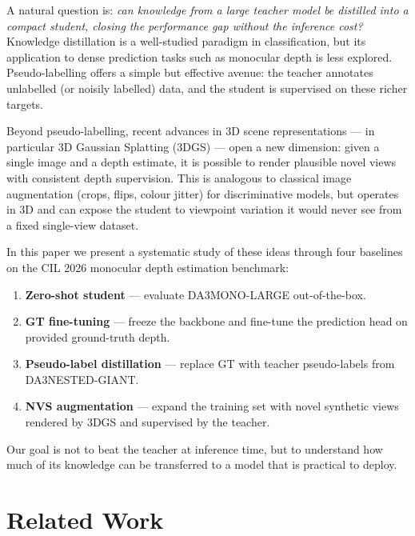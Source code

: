 \documentclass{article}
\begin{document}
A natural question is: \emph{can knowledge from a large teacher model be distilled into a compact student, closing the performance gap without the inference cost?}
Knowledge distillation \cite{TODO_hinton_kd} is a well-studied paradigm in classification, but its application to dense prediction tasks such as monocular depth is less explored.
Pseudo-labelling \cite{TODO_pseudolabel} offers a simple but effective avenue: the teacher annotates unlabelled (or noisily labelled) data, and the student is supervised on these richer targets.

Beyond pseudo-labelling, recent advances in 3D scene representations — in particular 3D Gaussian Splatting (3DGS) \cite{TODO_3dgs} — open a new dimension: given a single image and a depth estimate, it is possible to render plausible novel views with consistent depth supervision.
This is analogous to classical image augmentation (crops, flips, colour jitter) for discriminative models, but operates in 3D and can expose the student to viewpoint variation it would never see from a fixed single-view dataset.

In this paper we present a systematic study of these ideas through four baselines on the CIL 2026 monocular depth estimation benchmark:
\begin{enumerate}
    \item \textbf{Zero-shot student} — evaluate DA3MONO-LARGE out-of-the-box.
    \item \textbf{GT fine-tuning} — freeze the backbone and fine-tune the prediction head on provided ground-truth depth.
    \item \textbf{Pseudo-label distillation} — replace GT with teacher pseudo-labels from DA3NESTED-GIANT.
    \item \textbf{NVS augmentation} — expand the training set with novel synthetic views rendered by 3DGS and supervised by the teacher.
\end{enumerate}
Our goal is not to beat the teacher at inference time, but to understand how much of its knowledge can be transferred to a model that is practical to deploy.


\section{Related Work}
\label{sec:related}

\end{document}
